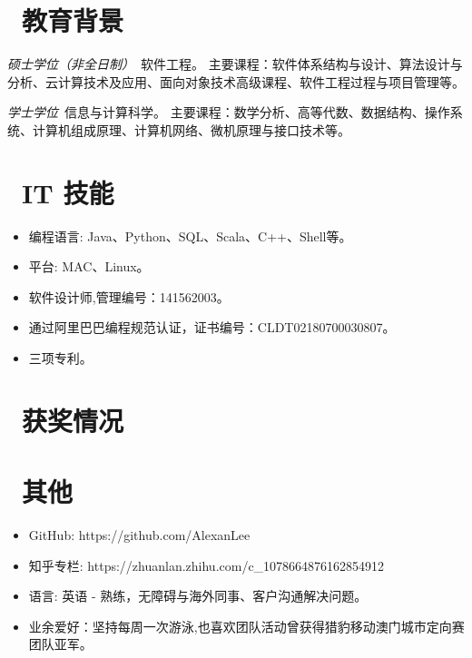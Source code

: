 \documentclass{resume}
\begin{document}
\section{\faGraduationCap\  教育背景}
\textit{硕士学位（非全日制）}\ 软件工程。
 主要课程：软件体系结构与设计、算法设计与分析、云计算技术及应用、面向对象技术高级课程、软件工程过程与项目管理等。

\textit{学士学位}\ 信息与计算科学。
 主要课程：数学分析、高等代数、数据结构、操作系统、计算机组成原理、计算机网络、微机原理与接口技术等。



\section{\faCogs\ IT 技能}
\begin{itemize}[parsep=0.5ex]
  \item 编程语言: Java、Python、SQL、Scala、C++、Shell等。
  \item 平台: MAC、Linux。
  \item 软件设计师,管理编号：141562003。
  \item 通过阿里巴巴编程规范认证，证书编号：CLDT02180700030807。
  \item 三项专利。
\end{itemize}

\section{\faHeartO\ 获奖情况}

\section{\faInfo\ 其他}
\begin{itemize}[parsep=0.5ex]
  \item GitHub: https://github.com/AlexanLee
  \item 知乎专栏: https://zhuanlan.zhihu.com/c\_1078664876162854912
  \item 语言: 英语 - 熟练，无障碍与海外同事、客户沟通解决问题。
  \item 业余爱好：坚持每周一次游泳,也喜欢团队活动曾获得猎豹移动澳门城市定向赛团队亚军。
\end{itemize}

%
%
\end{document}
